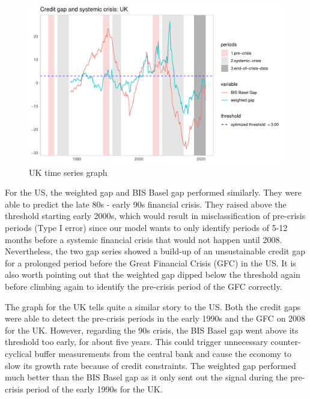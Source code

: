 \documentclass[
  12pt,
]{article}
\begin{document}
\begin{figure}

{\centering \includegraphics[width=1\linewidth]{../Data/Output/Graphs/Weighted_credit_gap_UK} 

}

\caption{UK time series graph}\label{fig:wUK}
\end{figure}

For the US, the weighted gap and BIS Basel gap performed similarly. They were able to predict the late 80s - early 90s financial crisis. They raised above the threshold starting early 2000s, which would result in misclassification of pre-crisis periods (Type I error) since our model wants to only identify periods of 5-12 months before a systemic financial crisis that would not happen until 2008. Nevertheless, the two gap series showed a build-up of an unsustainable credit gap for a prolonged period before the Great Financial Crisis (GFC) in the US. It is also worth pointing out that the weighted gap dipped below the threshold again before climbing again to identify the pre-crisis period of the GFC correctly.

The graph for the UK tells quite a similar story to the US. Both the credit gaps were able to detect the pre-crisis periods in the early 1990s and the GFC on 2008 for the UK. However, regarding the 90s crisis, the BIS Basel gap went above its threshold too early, for about five years. This could trigger unnecessary counter-cyclical buffer measurements from the central bank and cause the economy to slow its growth rate because of credit constraints. The weighted gap performed much better than the BIS Basel gap as it only sent out the signal during the pre-crisis period of the early 1990s for the UK.
\end{document}
